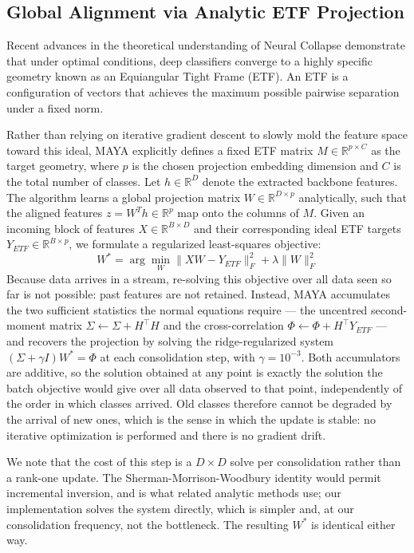 \subsection{Global Alignment via Analytic ETF Projection}
\label{sec:method_etf}
Recent advances in the theoretical understanding of Neural Collapse demonstrate that under optimal conditions, deep classifiers converge to a highly specific geometry known as an Equiangular Tight Frame (ETF). An ETF is a configuration of vectors that achieves the maximum possible pairwise separation under a fixed norm. 

Rather than relying on iterative gradient descent to slowly mold the feature space toward this ideal, MAYA explicitly defines a fixed ETF matrix $M \in \mathbb{R}^{p \times C}$ as the target geometry, where $p$ is the chosen projection embedding dimension and $C$ is the total number of classes. Let $h \in \mathbb{R}^D$ denote the extracted backbone features. The algorithm learns a global projection matrix $W \in \mathbb{R}^{D \times p}$ analytically, such that the aligned features $z = W^T h \in \mathbb{R}^p$ map onto the columns of $M$. Given an incoming block of features $X \in \mathbb{R}^{B \times D}$ and their corresponding ideal ETF targets $Y_{ETF} \in \mathbb{R}^{B \times p}$, we formulate a regularized least-squares objective:
\begin{equation}
    W^* = \arg\min_W \| X W - Y_{ETF} \|_F^2 + \lambda \|W\|_F^2
\end{equation}
Because data arrives in a stream, re-solving this objective over all data seen so far is not possible: past features are not retained. Instead, MAYA accumulates the two sufficient statistics the normal equations require --- the uncentred second-moment matrix $\Sigma \gets \Sigma + H^\top H$ and the cross-correlation $\Phi \gets \Phi + H^\top Y_{ETF}$ --- and recovers the projection by solving the ridge-regularized system $(\Sigma + \gamma I) W^* = \Phi$ at each consolidation step, with $\gamma = 10^{-3}$. Both accumulators are additive, so the solution obtained at any point is exactly the solution the batch objective would give over all data observed to that point, independently of the order in which classes arrived. Old classes therefore cannot be degraded by the arrival of new ones, which is the sense in which the update is stable: no iterative optimization is performed and there is no gradient drift.

We note that the cost of this step is a $D \times D$ solve per consolidation rather than a rank-one update. The Sherman-Morrison-Woodbury identity would permit incremental inversion, and is what related analytic methods use; our implementation solves the system directly, which is simpler and, at our consolidation frequency, not the bottleneck. The resulting $W^*$ is identical either way.

